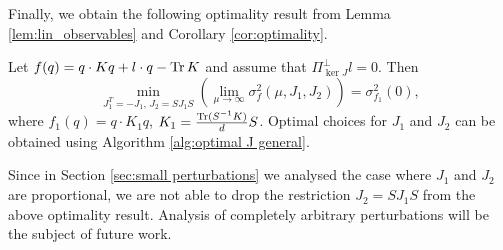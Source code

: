 Finally, we obtain the following optimality result from Lemma \ref{lem:lin_observables} and Corollary \ref{cor:optimality}.
\begin{corollary}
	Let $f(q)=q\cdot Kq+l\cdot q-\operatorname{Tr} K$ and assume that $\Pi^{\perp}_{\ker J}l=0$.
	Then 
	\[
	\min_{J_1^T=-J_1,\, J_2=SJ_1 S}\left(\lim_{\mu\rightarrow\infty} \sigma^2_{f}(\mu,J_1,J_2)\right)=\sigma^2_{f_1}(0),
	\]
	where $f_{1}(q)=q\cdot K_{1}q$, $K_{1}=\frac{\operatorname{Tr}(S^{-1}K)}{d}S$.
	Optimal choices for $J_{1}$ and $J_{2}$ can be obtained using Algorithm \ref{alg:optimal J general}.
\end{corollary}
\begin{remark}
	Since in Section \ref{sec:small perturbations} we analysed the case
	where $J_{1}$ and $J_{2}$ are proportional, we are not able to drop
	the restriction $J_{2}=SJ_{1}S$ from the above optimality
	result. Analysis of completely arbitrary perturbations will be the
	subject of future work. 
\end{remark}

